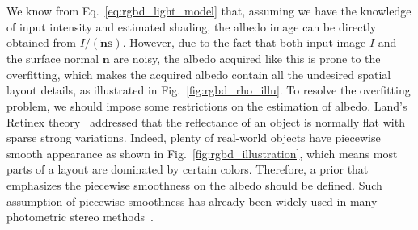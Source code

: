 We know from Eq.~\ref{eq:rgbd_light_model} that, assuming we have the knowledge of input intensity and estimated shading, the albedo image can be directly obtained from $I/(\tilde{\mathbf{n}}\mathbf{s})$.
However, due to the fact that both input image $I$ and the surface normal $\mathbf{n}$ are noisy, the albedo acquired like this is prone to the overfitting, which makes the acquired albedo contain all the undesired spatial layout details, as illustrated in Fig.~\ref{fig:rgbd_rho_illu}.
To resolve the overfitting problem, we should impose some restrictions on the estimation of albedo.
Land's Retinex theory~\cite{land1971lightness} addressed that the reflectance of an object is normally flat with sparse strong variations.
Indeed, plenty of real-world objects have piecewise smooth appearance as shown in Fig.~\ref{fig:rgbd_illustration}, which means most parts of a layout are dominated by certain colors.
Therefore, a prior that emphasizes the piecewise smoothness on the albedo should be defined.
Such assumption of piecewise smoothness has already been widely used in many photometric stereo methods~\cite{alldrin2008photometric,queau2015solving}.

